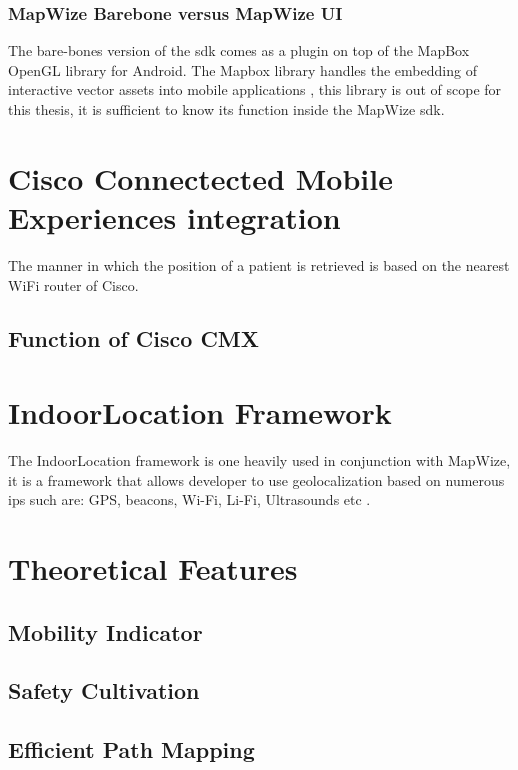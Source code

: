\subsubsection{MapWize Barebone versus MapWize UI}
The bare-bones version of the \acrshort{sdk} comes as a plugin on top of the MapBox OpenGL library for Android. The Mapbox library handles the embedding of interactive vector assets into mobile applications \cite{Mabox2019}, this library is out of scope for this thesis, it is sufficient to know its function inside the MapWize \acrshort{sdk}. 
\section{Cisco Connectected Mobile Experiences integration}
The manner in which the position of a patient is retrieved is based on the nearest WiFi router of Cisco.
\subsection{Function of Cisco CMX}
\section{IndoorLocation Framework}
The IndoorLocation framework is one heavily used in conjunction with MapWize, it is a framework that allows developer to use geolocalization based on numerous \acrfull{ips} such are: GPS, beacons, Wi-Fi, Li-Fi, Ultrasounds etc \cite{IndoorLocation.io2019}.
\section{Theoretical Features}
\subsection{Mobility Indicator}
\subsection{Safety Cultivation}
\subsection{Efficient Path Mapping}


